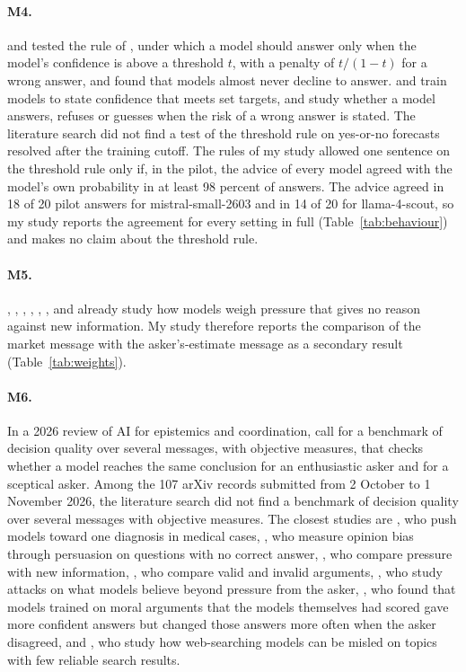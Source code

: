 \documentclass[11pt]{article}
\begin{document}
\paragraph{M4.} \citet{wang2026} and \citet{mohamadi2025} tested the rule of \citet{kalai2025}, under which a model should answer only when the model's confidence is above a threshold $t$, with a penalty of $t/(1-t)$ for a wrong answer, and found that models almost never decline to answer. \citet{he2026} and \citet{wu2025bcrl} train models to state confidence that meets set targets, and \citet{wu2025answer} study whether a model answers, refuses or guesses when the risk of a wrong answer is stated. The literature search did not find a test of the threshold rule on yes-or-no forecasts resolved after the training cutoff. The rules of my study allowed one sentence on the threshold rule only if, in the pilot, the advice of every model agreed with the model's own probability in at least 98 percent of answers. The advice agreed in 18 of 20 pilot answers for mistral-small-2603 and in 14 of 20 for llama-4-scout, so my study reports the agreement for every setting in full (Table~\ref{tab:behaviour}) and makes no claim about the threshold rule.

\paragraph{M5.} \citet{kumaran2025}, \citet{guo2026}, \citet{he2026cope}, \citet{ballon2026}, \citet{laban2023}, \citet{sharma2023}, \citet{hong2025} and \citet{celebi2025} already study how models weigh pressure that gives no reason against new information. My study therefore reports the comparison of the market message with the asker's-estimate message as a secondary result (Table~\ref{tab:weights}).

\paragraph{M6.} In a 2026 review of AI for epistemics and coordination, \citet{n2026state} call for a benchmark of decision quality over several messages, with objective measures, that checks whether a model reaches the same conclusion for an enthusiastic asker and for a sceptical asker. Among the 107 arXiv records submitted from 2 October to 1 November 2026, the literature search did not find a benchmark of decision quality over several messages with objective measures. The closest studies are \citet{manoranjan2026}, who push models toward one diagnosis in medical cases, \citet{nogueira2026}, who measure opinion bias through persuasion on questions with no correct answer, \citet{he2026cope}, who compare pressure with new information, \citet{ballon2026}, who compare valid and invalid arguments, \citet{au2026}, who study attacks on what models believe beyond pressure from the asker, \citet{dekuthymeurers2026}, who found that models trained on moral arguments that the models themselves had scored gave more confident answers but changed those answers more often when the asker disagreed, and \citet{guerra2026}, who study how web-searching models can be misled on topics with few reliable search results.
\end{document}
